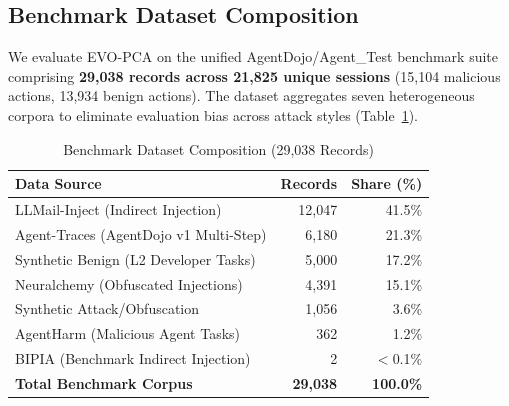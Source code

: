 \documentclass[conference]{IEEEtran}
\begin{document}
\subsection{Benchmark Dataset Composition}
We evaluate EVO-PCA on the unified AgentDojo/Agent\_Test benchmark suite comprising \textbf{29,038 records across 21,825 unique sessions} (15,104 malicious actions, 13,934 benign actions). The dataset aggregates seven heterogeneous corpora to eliminate evaluation bias across attack styles (Table~\ref{tab:dataset}).

\begin{table}[t]
\caption{Benchmark Dataset Composition (29,038 Records)}
\label{tab:dataset}
\centering
\begin{tabular}{lrr}
\toprule
\textbf{Data Source} & \textbf{Records} & \textbf{Share (\%)} \\
\midrule
LLMail-Inject (Indirect Injection) & 12,047 & 41.5\% \\
Agent-Traces (AgentDojo v1 Multi-Step) & 6,180 & 21.3\% \\
Synthetic Benign (L2 Developer Tasks) & 5,000 & 17.2\% \\
Neuralchemy (Obfuscated Injections) & 4,391 & 15.1\% \\
Synthetic Attack/Obfuscation & 1,056 & 3.6\% \\
AgentHarm (Malicious Agent Tasks) & 362 & 1.2\% \\
BIPIA (Benchmark Indirect Injection) & 2 & $<$0.1\% \\
\midrule
\textbf{Total Benchmark Corpus} & \textbf{29,038} & \textbf{100.0\%} \\
\bottomrule
\end{tabular}
\end{table}
\end{document}
